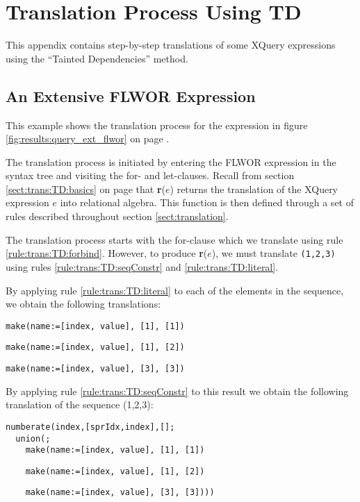 \chapter{Translation Process Using TD}
\label{appendix:transl}
This appendix contains step-by-step translations of some XQuery expressions
using the ``Tainted Dependencies'' method.

\section{An Extensive FLWOR Expression}
\label{appendix:transl:ext_flwor}
This example shows the translation process for the expression in figure
\ref{fig:results:query_ext_flwor} on page \pageref{fig:results:query_ext_flwor}.

The translation process is initiated by entering the FLWOR expression in the
syntax tree and visiting the for- and let-clauses. Recall from section
\ref{sect:trans:TD:basics} on page \pageref{sect:trans:TD:basics} that
\textbf{r}($e$) returns the translation of the XQuery expression $e$ into
relational algebra. This function is then defined through a set of rules
described throughout section \ref{sect:translation}.

The translation process starts with the for-clause which we translate using
rule \ref{rule:trans:TD:forbind}. However, to produce \textbf{r}($e$), we must
translate \texttt{(1,2,3)} using rules \ref{rule:trans:TD:seqConstr} and
\ref{rule:trans:TD:literal}. 

By applying rule \ref{rule:trans:TD:literal} to each of the elements in the
sequence, we obtain the following translations:
\begin{Verbatim}
make(name:=[index, value], [1], [1])
\end{Verbatim}
\begin{Verbatim}
make(name:=[index, value], [1], [2])
\end{Verbatim}
\begin{Verbatim}
make(name:=[index, value], [3], [3])
\end{Verbatim}

By applying rule \ref{rule:trans:TD:seqConstr} to this result we obtain the
following translation of the sequence (1,2,3):

\begin{Verbatim}
numberate(index,[sprIdx,index],[];
  union(;
    make(name:=[index, value], [1], [1])
    \end{Verbatim}
    \begin{Verbatim}
    make(name:=[index, value], [1], [2])
    \end{Verbatim}
    \begin{Verbatim}
    make(name:=[index, value], [3], [3])))
\end{Verbatim}

